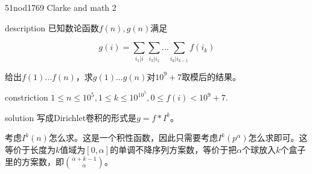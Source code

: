 \documentclass{beamer}
\begin{document}
	\begin{frame}{51nod1769 Clarke and math 2}
	\begin{block}{description}
		已知数论函数$f(n),g(n)$满足
		
		$$g(i)=\sum_{i_1|i}\sum_{i_2|i_1}...\sum_{i_k|i_{k-1}}f(i_k)$$
		
		给出$f(1)...f(n)$，求$g(1)...g(n)$对$10^9+7$取模后的结果。
	\end{block}
	\begin{block}{constriction}
		$1 \le n \le 10^5, 1 \le k \le 10^{10^5}, 0 \le f(i) < 10^9+7.$
	\end{block}
	\pause
	\begin{block}{solution}
		写成Dirichlet卷积的形式是$g=f*I^k$。
		
		考虑$I^k(n)$怎么求。这是一个积性函数，因此只需要考虑$I^k(p^{\alpha})$怎么求即可。这等价于长度为$k$值域为$[0,\alpha]$的单调不降序列方案数，等价于把$\alpha$个球放入$k$个盒子里的方案数，即$\binom{\alpha+k-1}{\alpha}$。
	\end{block}
\end{frame}
\end{document}
